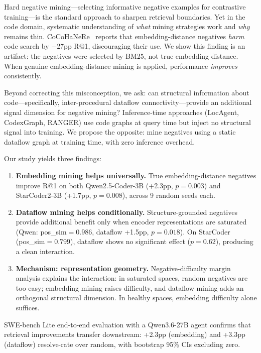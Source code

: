 \documentclass[11pt,a4paper]{article}
\begin{document}
Hard negative mining---selecting informative negative examples for contrastive training---is the standard approach to sharpen retrieval boundaries. Yet in the code domain, systematic understanding of \emph{what} mining strategies work and \emph{why} remains thin. CoCoHaNeRe~\cite{cocohanere} reports that embedding-distance negatives \emph{harm} code search by $-$27pp R@1, discouraging their use. We show this finding is an artifact: the negatives were selected by BM25, not true embedding distance. When genuine embedding-distance mining is applied, performance \emph{improves} consistently.

Beyond correcting this misconception, we ask: can structural information about code---specifically, inter-procedural dataflow connectivity---provide an additional signal dimension for negative mining? Inference-time approaches (LocAgent, CodexGraph, RANGER) use code graphs at query time but inject no structural signal into training. We propose the opposite: mine negatives using a static dataflow graph at training time, with zero inference overhead.

Our study yields three findings:

\begin{enumerate}
\item \textbf{Embedding mining helps universally.} True embedding-distance negatives improve R@1 on both Qwen2.5-Coder-3B (+2.3pp, $p{=}0.003$) and StarCoder2-3B (+1.7pp, $p{=}0.008$), across 9 random seeds each.

\item \textbf{Dataflow mining helps conditionally.} Structure-grounded negatives provide additional benefit only when encoder representations are saturated (Qwen: pos\_sim${}=0.986$, dataflow +1.5pp, $p{=}0.018$). On StarCoder (pos\_sim${}=0.799$), dataflow shows no significant effect ($p{=}0.62$), producing a clean interaction.

\item \textbf{Mechanism: representation geometry.} Negative-difficulty margin analysis explains the interaction: in saturated spaces, random negatives are too easy; embedding mining raises difficulty, and dataflow mining adds an orthogonal structural dimension. In healthy spaces, embedding difficulty alone suffices.
\end{enumerate}

SWE-bench Lite end-to-end evaluation with a Qwen3.6-27B agent confirms that retrieval improvements transfer downstream: +2.3pp (embedding) and +3.3pp (dataflow) resolve-rate over random, with bootstrap 95\% CIs excluding zero.
\end{document}
